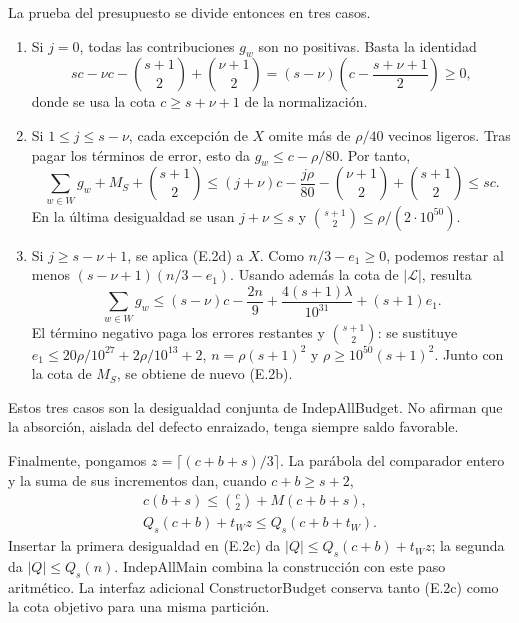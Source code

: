 \documentclass[spanish,11pt,a4paper]{article}
\providecommand{\tightlist}{\setlength{\itemsep}{0pt}\setlength{\parskip}{0pt}}
\begin{document}
La prueba del presupuesto se divide entonces en tres casos.

\begin{enumerate}
\def\labelenumi{\arabic{enumi}.}
\tightlist
\item
  Si \(j=0\), todas las contribuciones \(g_w\) son no positivas. Basta la identidad \[
  sc-\nu c-\binom{s+1}2+\binom{\nu+1}2
  =(s-\nu)\left(c-\frac{s+\nu+1}{2}\right)\ge0,
  \] donde se usa la cota \(c\ge s+\nu+1\) de la normalización.
\item
  Si \(1\le j\le s-\nu\), cada excepción de \(X\) omite más de \(\rho/40\) vecinos ligeros. Tras pagar los términos de error, esto da \(g_w\le c-\rho/80\). Por tanto, \[
  \sum_{w\in W}g_w+M_S+\binom{s+1}2
  \le(j+\nu)c-\frac{j\rho}{80}
       -\binom{\nu+1}2+\binom{s+1}2\le sc.
  \] En la última desigualdad se usan \(j+\nu\le s\) y \(\binom{s+1}2\le\rho/(2\cdot10^{50})\).
\item
  Si \(j\ge s-\nu+1\), se aplica (E.2d) a \(X\). Como \(n/3-e_1\ge0\), podemos restar al menos \((s-\nu+1)(n/3-e_1)\). Usando además la cota de \(|\mathcal L|\), resulta \[
  \sum_{w\in W}g_w
  \le (s-\nu)c-\frac{2n}{9}
     +\frac{4(s+1)\lambda}{10^{31}}+(s+1)e_1.
  \] El término negativo paga los errores restantes y \(\binom{s+1}2\): se sustituye \(e_1\le20\rho/10^{27}+2\rho/10^{13}+2\), \(n=\rho(s+1)^2\) y \(\rho\ge10^{50}(s+1)^2\). Junto con la cota de \(M_S\), se obtiene de nuevo (E.2b).
\end{enumerate}

Estos tres casos son la desigualdad conjunta de {\ttfamily\small IndepAllBudg\discretionary{\hbox{\ensuremath{\hookrightarrow}}}{}{}et}. No afirman que la absorción, aislada del defecto enraizado, tenga siempre saldo favorable.

Finalmente, pongamos \(z=\lceil(c+b+s)/3\rceil\). La parábola del comparador entero y la suma de sus incrementos dan, cuando \(c+b\ge s+2\), \[
\begin{gathered}
c(b+s)\le\binom c2+M(c+b+s),\\
Q_s(c+b)+t_W z\le Q_s(c+b+t_W).
\end{gathered}
\tag{E.2e}
\] Insertar la primera desigualdad en (E.2c) da \(|Q|\le Q_s(c+b)+t_W z\); la segunda da \(|Q|\le Q_s(n)\). {\ttfamily\small IndepAllMain} combina la construcción con este paso aritmético. La interfaz adicional {\ttfamily\small ConstructorB\discretionary{\hbox{\ensuremath{\hookrightarrow}}}{}{}udget} conserva tanto (E.2c) como la cota objetivo para una misma partición.
\end{document}
